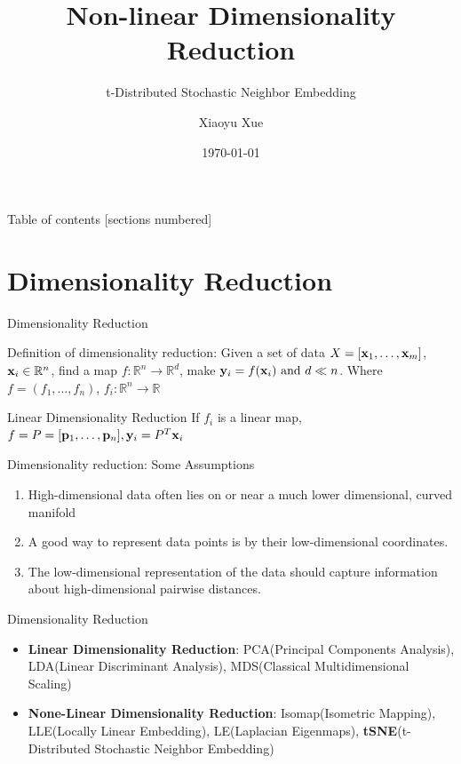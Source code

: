 \documentclass[10pt]{beamer}
\title{Non-linear Dimensionality Reduction}
\subtitle{t-Distributed Stochastic Neighbor Embedding}
\date{\today}
\author{Xiaoyu Xue}
\begin{document}
\maketitle

\begin{frame}{Table of contents}
  [sections numbered]
  \tableofcontents[hideallsubsections]
\end{frame}

\section{Dimensionality Reduction}
\begin{frame}{Dimensionality Reduction}
\begin{block}{Definition of dimensionality reduction:}
Given a set of data $X = [\bold{x}_1,\ldots,\bold{x}_m]$, $\bold{x}_i \in \mathbb{R}^n$, find a map $f: \mathbb{R}^n \to \mathbb{R}^d$, make $\bold{y}_i = f(\bold{x}_i) \textrm{ and } d\ll n$. Where $f = (f_1, \ldots, f_n)$, $f_i: \mathbb{R}^n \to \mathbb{R}$
\end{block}
\bigskip
\begin{block}{Linear Dimensionality Reduction}
If $f_i$ is a linear map, $f = P = [\bold{p}_1, \ldots, \bold{p}_n], \bold{y}_i = P^T\bold{x}_i$
\end{block}
\end{frame}

\begin{frame}{Dimensionality reduction: Some Assumptions }
\begin{enumerate}
\setlength{\itemsep}{5pt}
\setlength{\parsep}{5pt}
\setlength{\parskip}{5pt}
	\item High-dimensional data often lies on or near a much lower dimensional, curved manifold 
	\item A good way to represent data points is by their low-dimensional coordinates.
	\item The low-dimensional representation of the data should capture information about high-dimensional pairwise distances. 
\end{enumerate}
\end{frame}

\begin{frame}{Dimensionality Reduction}
\begin{itemize}
\setlength{\itemsep}{12pt}
\setlength{\parsep}{12pt}
\setlength{\parskip}{12pt}
	\item \textbf{Linear Dimensionality Reduction}: PCA(Principal Components Analysis), LDA(Linear Discriminant Analysis), MDS(Classical Multidimensional Scaling) 
	\item \textbf{None-Linear Dimensionality Reduction}: Isomap(Isometric Mapping), LLE(Locally Linear Embedding), LE(Laplacian Eigenmaps), \textbf{tSNE}(t-Distributed Stochastic Neighbor Embedding)
\end{itemize}
\end{frame}
\end{document}
